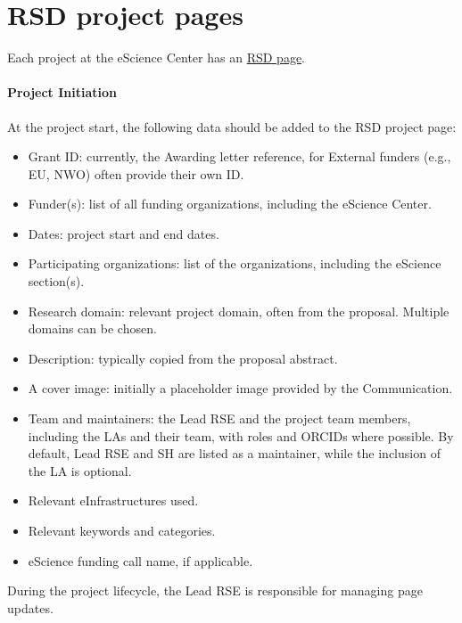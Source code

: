 \section{RSD project pages}
\label{app:rsd-page}

Each project at the eScience Center has an 
\href{https://research-software-directory.org/organisations/netherlands-escience-center?tab=projects}{RSD page}. 

\paragraph{Project Initiation} At the project start, the following data should be added to the RSD project page:
\begin{itemize}
   \item Grant ID: currently, the Awarding letter reference, for External funders (e.g., EU, NWO) often provide their 
   own ID.
   \item Funder(s): list of all funding organizations, including the eScience Center.
   \item Dates: project start and end dates.
   \item Participating organizations: list of the organizations, including the eScience section(s).
   \item Research domain: relevant project domain, often from the proposal. Multiple domains can be chosen.
   \item Description: typically copied from the proposal abstract.
   \item A cover image: initially a placeholder image provided by the Communication.
   \item Team and maintainers: the Lead RSE and the project team members, including the LAs and their team, 
   with roles and ORCIDs where possible. By default, Lead RSE and SH are listed as a maintainer, while the inclusion of 
   the LA is optional. 
   \item Relevant eInfrastructures used.
   \item Relevant keywords and categories.
   \item eScience funding call name, if applicable.
 \end{itemize}
 During the project lifecycle, the Lead RSE is responsible for managing page updates.

